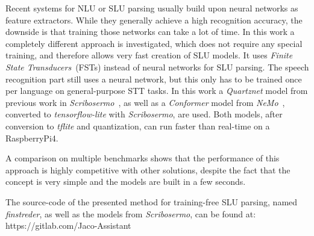 \documentclass[a4paper]{article}
\begin{document}
\vspace{9pt}
Recent systems for NLU or SLU parsing usually build upon neural networks as feature extractors. While they generally achieve a high recognition accuracy, the downside is that training those networks can take a lot of time. In this work a completely different approach is investigated, which does not require any special training, and therefore allows very fast creation of SLU models. It uses \textit{Finite State Transducers}~(FSTs) instead of neural networks for SLU parsing.  The speech recognition part still uses a neural network, but this only has to be trained once per language on general-purpose STT tasks. In this work a \textit{Quartznet} \cite{QNET} model from previous work in \textit{\mbox{Scribosermo}}~\cite{SCRSO}, as well as a \textit{Conformer} \cite{CNET} model from \textit{NeMo}~\cite{NEMO}, converted to \textit{tensorflow-lite} with \textit{Scribosermo}, are used. Both models, after conversion to \textit{tflite} and quantization, can run faster than real-time on a RaspberryPi4. 

A comparison on multiple benchmarks shows that the performance of this approach is highly competitive with other solutions, despite the fact that the concept is very simple and the models are built in a few seconds. 

The source-code of the presented method for training-free SLU parsing, named \mbox{\textit{finstreder}}, as well as the models from \mbox{\textit{Scribosermo}}, can be found at: \mbox{https://gitlab.com/Jaco-Assistant}
\end{document}
